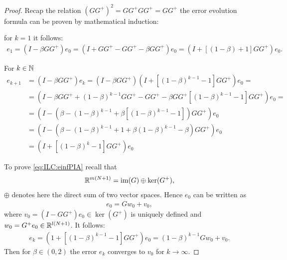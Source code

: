 \begin{proof}
	
	Recap the relation $(GG^+)^2 = GG^+GG^+ = GG^+$ the error evolution formula can be proven by mathematical induction: 
	
	for $k = 1$ it follows: 
	\begin{align*}
	e_1 = (I - \beta G G^+)e_0 = (I + GG^+ - GG^+ - \beta G G^+)e_0 = (I + \left[(1 - \beta) + 1\right]GG^+)e_0.
	\end{align*}
	
	For $k \in {\mathbb{N}}$  
	\begin{align*}
	e_{k+1} &= ( I - \beta G G^+)e_k = ( I - \beta G G^+) (I+  \left[(1-\beta)^{k-1} - 1\right] G G^+) e_0 = \\
	& = \left(I - \beta G G^+ + (1-\beta)^{k-1}GG^+ - GG^+ - \beta GG^+\left[(1 - \beta)^{k-1} - 1\right]GG^+\right)e_0=\\
	& = \left(I - (\beta - (1-\beta)^{k-1} + \beta\left[(1 - \beta)^{k-1} - 1\right])G G^+\right)e_0\\
	& = \left(I - \left(\beta - (1-\beta)^{k-1} + 1 + \beta(1-\beta)^{k-1} - \beta\right)GG^+\right)e_0\\
	& = (I+  \left[(1-\beta)^k - 1\right] G G^+) e_0
	\end{align*}
	
	To prove \eqref{eq:ILC:einfPIA}  recall that 
	\begin{align*}
	{\mathbb{R}}^{m(N+1)} = \operatorname{im}(G)\oplus \ker (G^+),
	\end{align*}
	$\oplus$ denotes here the direct sum of two vector spaces. 
	Hence $e_0$ can be written as 
	\begin{align*}
	e_0 = G w_0 + v_0,
	\end{align*}
	where $v_0 = (I - G G^+)e_0 \in \ker (G^+)$  is uniquely defined and $w_0 = G^+ e_0 \in {\mathbb{R}}^{l(N+1)}$. It follows: 
	\begin{align*}
	e_{k} = (1+ \left[(1 - \beta)^{k-1} - 1\right]GG^+)e_0 = (1-\beta)^{k-1} G w_0 + v_0.
	\end{align*}
	Then for $\beta \in (0,2)$ the error $e_k$ converges to $v_0$ for $k \to \infty$. 
\end{proof}


